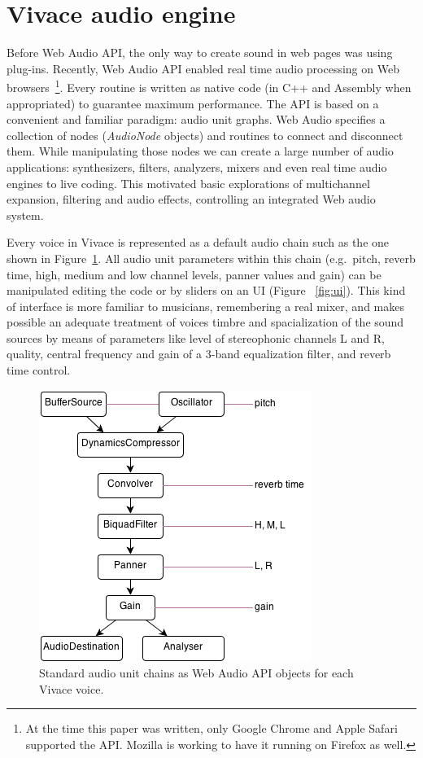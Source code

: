 \documentclass[letterpaper, 12pt]{article}
\begin{document}
\section{Vivace audio engine}

Before Web Audio API, the only way to create sound in web pages was
using plug-ins. Recently, Web Audio API enabled real time audio
processing on Web browsers~\footnote{At the time this paper was
  written, only Google Chrome and Apple Safari supported the
  API. Mozilla is working to have it running on Firefox as
  well.}. Every routine is written as native code (in C++ and Assembly
when appropriated) to guarantee maximum performance. The API is based
on a convenient and familiar paradigm: audio unit graphs. Web Audio
specifies a collection of nodes (\emph{AudioNode} objects) and
routines to connect and disconnect them. While manipulating those
nodes we can create a large number of audio applications:
synthesizers, filters, analyzers, mixers and even real time audio
engines to live coding. This motivated basic explorations of
multichannel expansion, filtering and audio effects, controlling an
integrated Web audio system.

Every voice in Vivace is represented as a default audio chain such as
the one shown in Figure~\ref{fig:chain}. All audio unit parameters
within this chain (e.g.\ pitch, reverb time, high, medium and low
channel levels, panner values and gain) can be manipulated editing the
code or by sliders on an UI (Figure ~\ref{fig:ui}). This kind of
interface is more familiar to musicians, remembering a real mixer, and
makes possible an adequate treatment of voices timbre and
spacialization of the sound sources by means of parameters like level
of stereophonic channels L and R, quality, central frequency and gain
of a 3-band equalization filter, and reverb time control.

\begin{figure}[htpb]
  \begin{center}
    \includegraphics[scale=.5]{img/fig_chain.png}
    \caption{Standard audio unit chains as Web Audio API objects for
      each Vivace voice.}
    \label{fig:chain}
  \end{center}
\end{figure}
\end{document}
